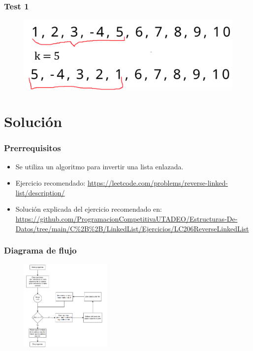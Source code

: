 \documentclass[17pt, t, lualatex]{beamer}
\begin{document}
\begin{frame}
  \frametitle{Test 1}

  \begin{figure}[h]
    \centering
    \includegraphics[width=\textwidth]{img/fig1.png}
  \end{figure}

\end{frame}



\section{Solución}

\insertsectionpage



\begin{frame}
  \frametitle{Prerrequisitos}

  \begin{itemize}
    \item Se utiliza un algoritmo para invertir una lista enlazada.
    \item Ejercicio recomendado: \url{https://leetcode.com/problems/reverse-linked-list/description/}
    \item Solución explicada del ejercicio recomendado en: \url{https://github.com/ProgramacionCompetitivaUTADEO/Estructuras-De-Datos/tree/main/C\%2B\%2B/LinkedList/Ejercicios/LC206ReverseLinkedList}
  \end{itemize}

\end{frame}


\begin{frame}
  \frametitle{Diagrama de flujo}


  \begin{figure}[h]
    \centering
    \includegraphics[width=0.4\textwidth]{img/fig2.png}
  \end{figure}


\end{frame}
\end{document}
